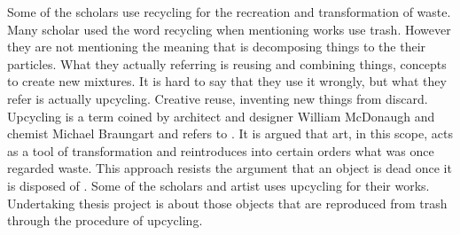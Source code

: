 Some of the scholars use recycling \citep{cerny1996recycled,herman1998trashformations} for the recreation and transformation of waste. Many scholar used the word recycling when mentioning works use trash. However they are not mentioning the meaning that is decomposing things to the their particles. What they actually referring is reusing and combining things, concepts to create new mixtures. It is hard to say that they use it wrongly, but what they refer is actually upcycling. Creative reuse, inventing new things from discard. Upcycling is a term coined by architect and designer William McDonaugh and chemist Michael Braungart and refers to  \citep[as cited in][63]{emgin2012trashion}. It is argued that art, in this scope, acts as a tool of transformation and reintroduces into certain orders what was once regarded waste. This approach resists the argument that an object is dead once it is disposed of \citep{emgin2012trashion}. Some of the scholars and artist uses upcycling for their works. Undertaking thesis project is about those objects that are reproduced from trash through the procedure of upcycling.

